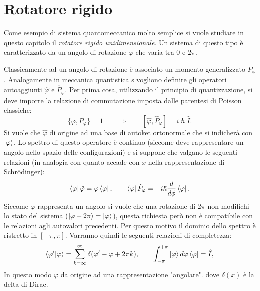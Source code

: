 \section{Rotatore rigido}
Come esempio di sistema quantomeccanico molto semplice si vuole studiare in questo capitolo il \emph{rotatore rigido unidimensionale}. Un sistema di questo tipo è caratterizzato da un angolo di rotazione $\varphi$ che varia tra $0$ e $2\pi$. 
\begin{figure}[H]
    \centering
\end{figure}
Classicamente ad un angolo di rotazione è associato un momento generalizzato $P_\varphi$. Analogamente in meccanica quantistica s vogliono definire gli operatori autoaggiunti $\hat \varphi$ e $\hat P_\varphi$. Per prima cosa, utilizzando il principio di quantizzazione, si deve imporre la relazione di commutazione imposta dalle parentesi di Poisson classiche:
\begin{equation*}
    \{\varphi,P_\varphi\}=1\qquad\Rightarrow\qquad[\hat\varphi,\hat P_\varphi]=i\hslash\hat{I}.
\end{equation*}
Si vuole che $\hat\varphi$ di origine ad una base di autoket ortonormale che si indicherà con $\ket{\varphi}$. Lo spettro di questo operatore è continuo (siccome deve rappresentare un angolo nello spazio delle configurazioni) e si suppone che valgano le seguenti relazioni (in analogia con quanto accade con $x$ nella rappresentazione di Schrödinger):
\begin{equation*}
    \bra{\varphi}\hat\varphi=\varphi\bra{\varphi},\qquad\bra{\varphi}\hat P_\varphi=-i\hslash\frac{d}{d\phi}\bra{\varphi}.
\end{equation*}
Siccome $\varphi$ rappresenta un angolo si vuole che una rotazione di $2\pi$ non modifichi lo stato del sistema ($\ket{\varphi+2\pi}=\ket{\varphi}$), questa richiesta però non è compatibile con le relazioni agli autovalori precedenti. Per questo motivo il dominio dello spettro è ristretto in $[-\pi,\pi]$. Varranno quindi le seguenti relazioni di completezza:
\begin{equation*}
    \braket{\varphi'|\varphi}=\sum_{k=\infty}^{\infty}\delta(\varphi'-\varphi+2\pi k),\qquad\int_{-\pi}^{+\pi}\ket{\varphi}d\varphi\bra{\varphi}=\hat I,
\end{equation*}
In questo modo $\varphi$ da origine ad una rappresentazione "angolare".
dove $\delta(x)$ è la delta di Dirac.

